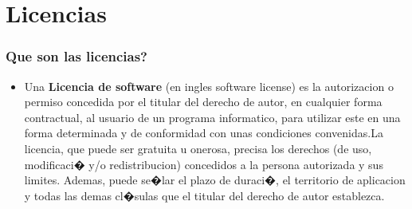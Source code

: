 \section{Licencias}
\frame
{
	\frametitle{Que son las licencias?}
	\begin{itemize}
	\item Una \textbf{Licencia de software} (en ingles software license) es la autorizacion o permiso concedida por el titular del derecho de autor, en cualquier forma contractual, al usuario de un programa informatico, para utilizar este en una forma determinada y de conformidad con unas condiciones convenidas.La licencia, que puede ser gratuita u onerosa, precisa los derechos (de uso, modificaci� y/o redistribucion) concedidos a la persona autorizada y sus limites. Ademas, puede se�lar el plazo de duraci�, el territorio de aplicacion y todas las demas cl�sulas que el titular del derecho de autor establezca.
	\end{itemize}
}


